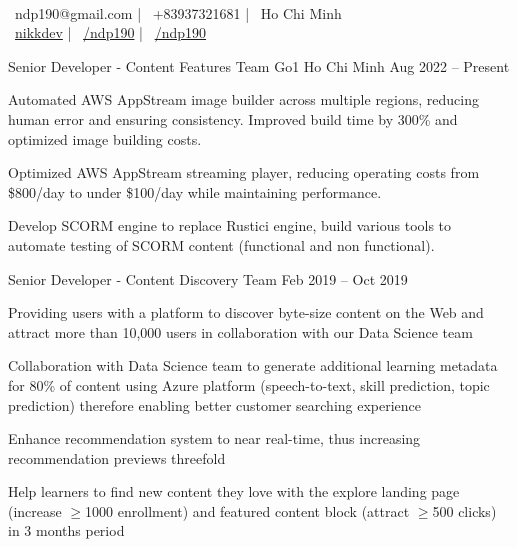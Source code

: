 \documentclass[]{awesome-cv}
\begin{document}
    
\begin{center}
      \\
	\vspace{2mm}
	{\faEnvelope\ ndp190@gmail.com} | {\faMobile\ +83937321681} | {\faMapMarker\ Ho Chi Minh} \\
	{\faHome\ \href{https://nikkdev.com/}{nikkdev}} | {\faLinkedinSquare\ \href{https://www.linkedin.com/in/ndp190}{/ndp190}} | {\faGithubSquare\ \href{https://github.com/ndp190}{/ndp190}}
\end{center}

\begin{cventries}
	\cventry
    {Senior Developer - Content Features Team}
	{Go1}
	{Ho Chi Minh}
	{Aug 2022 – Present}
	{\begin{cvitems}
    \item {Automated AWS AppStream image builder across multiple regions, reducing human error and ensuring consistency. Improved build time by 300\% and optimized image building costs.}
    \item {Optimized AWS AppStream streaming player, reducing operating costs from \$800/day to under \$100/day while maintaining performance.}
    \item {Develop SCORM engine to replace Rustici engine, build various tools to automate testing of SCORM content (functional and non functional).}
		\end{cvitems}}
	\cventry
	{Senior Developer - Content Discovery Team}
	{}
	{}
	{Feb 2019 – Oct 2019}
	{\begin{cvitems}
		\item {Providing users with a platform to discover byte-size content on the Web and attract more than 10,000 users in collaboration with our Data Science team}
		\item {Collaboration with Data Science team to generate additional learning metadata for 80\% of content using Azure platform (speech-to-text, skill prediction, topic prediction) therefore enabling better customer searching experience}
		\item {Enhance recommendation system to near real-time, thus increasing recommendation previews threefold}
		\item {Help learners to find new content they love with the explore landing page (increase $\geq$1000 enrollment) and featured content block (attract $\geq$500 clicks) in 3 months period}

\end{cvitems}}
\end{cventries}
\end{document}

